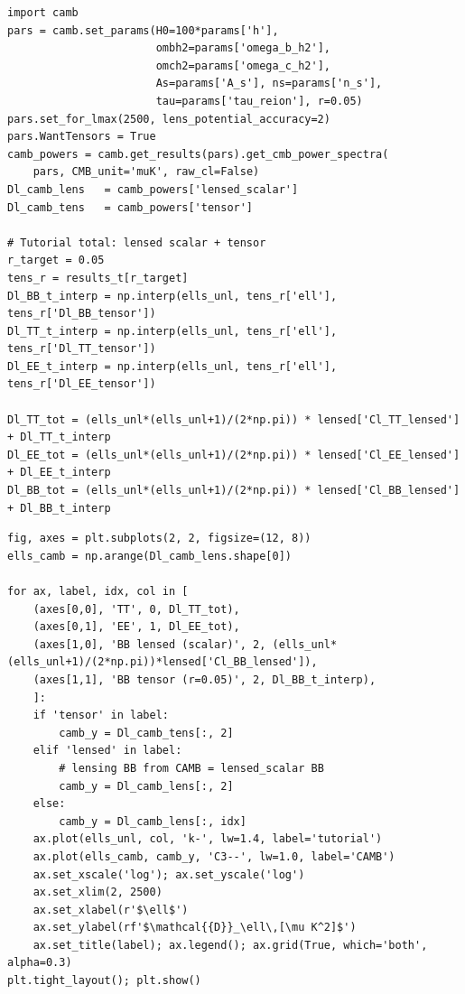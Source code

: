 \begin{codebox}
\begin{lstlisting}[style=python]
import camb
pars = camb.set_params(H0=100*params['h'],
                       ombh2=params['omega_b_h2'],
                       omch2=params['omega_c_h2'],
                       As=params['A_s'], ns=params['n_s'],
                       tau=params['tau_reion'], r=0.05)
pars.set_for_lmax(2500, lens_potential_accuracy=2)
pars.WantTensors = True
camb_powers = camb.get_results(pars).get_cmb_power_spectra(
    pars, CMB_unit='muK', raw_cl=False)
Dl_camb_lens   = camb_powers['lensed_scalar']
Dl_camb_tens   = camb_powers['tensor']

# Tutorial total: lensed scalar + tensor
r_target = 0.05
tens_r = results_t[r_target]
Dl_BB_t_interp = np.interp(ells_unl, tens_r['ell'], tens_r['Dl_BB_tensor'])
Dl_TT_t_interp = np.interp(ells_unl, tens_r['ell'], tens_r['Dl_TT_tensor'])
Dl_EE_t_interp = np.interp(ells_unl, tens_r['ell'], tens_r['Dl_EE_tensor'])

Dl_TT_tot = (ells_unl*(ells_unl+1)/(2*np.pi)) * lensed['Cl_TT_lensed'] + Dl_TT_t_interp
Dl_EE_tot = (ells_unl*(ells_unl+1)/(2*np.pi)) * lensed['Cl_EE_lensed'] + Dl_EE_t_interp
Dl_BB_tot = (ells_unl*(ells_unl+1)/(2*np.pi)) * lensed['Cl_BB_lensed'] + Dl_BB_t_interp
\end{lstlisting}
\end{codebox}

\begin{codebox}
\begin{lstlisting}[style=python]
fig, axes = plt.subplots(2, 2, figsize=(12, 8))
ells_camb = np.arange(Dl_camb_lens.shape[0])

for ax, label, idx, col in [
    (axes[0,0], 'TT', 0, Dl_TT_tot),
    (axes[0,1], 'EE', 1, Dl_EE_tot),
    (axes[1,0], 'BB lensed (scalar)', 2, (ells_unl*(ells_unl+1)/(2*np.pi))*lensed['Cl_BB_lensed']),
    (axes[1,1], 'BB tensor (r=0.05)', 2, Dl_BB_t_interp),
    ]:
    if 'tensor' in label:
        camb_y = Dl_camb_tens[:, 2]
    elif 'lensed' in label:
        # lensing BB from CAMB = lensed_scalar BB
        camb_y = Dl_camb_lens[:, 2]
    else:
        camb_y = Dl_camb_lens[:, idx]
    ax.plot(ells_unl, col, 'k-', lw=1.4, label='tutorial')
    ax.plot(ells_camb, camb_y, 'C3--', lw=1.0, label='CAMB')
    ax.set_xscale('log'); ax.set_yscale('log')
    ax.set_xlim(2, 2500)
    ax.set_xlabel(r'$\ell$')
    ax.set_ylabel(rf'$\mathcal{{D}}_\ell\,[\mu K^2]$')
    ax.set_title(label); ax.legend(); ax.grid(True, which='both', alpha=0.3)
plt.tight_layout(); plt.show()
\end{lstlisting}
\end{codebox}

